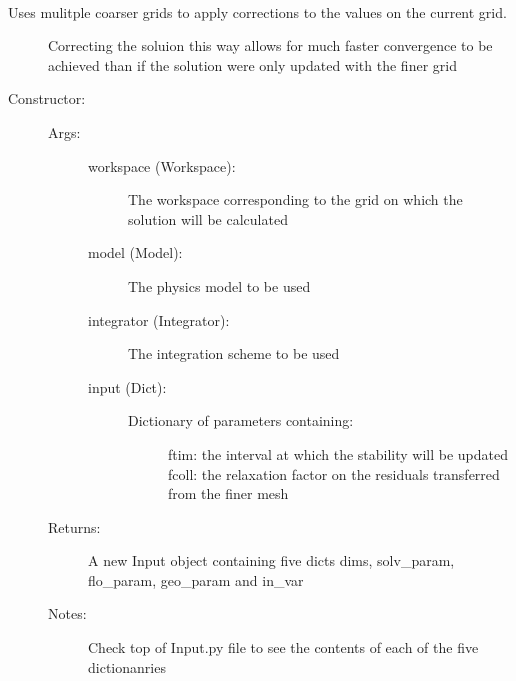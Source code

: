 \documentclass[letterpaper,10pt,english]{sphinxmanual}
\begin{document}
\begin{fulllineitems}
\label{\detokenize{autoapi/MultiGrid/index:MultiGrid.MultiGrid}}~\begin{description}
\item[{Uses mulitple coarser grids to apply corrections to the values on the current grid.}] \leavevmode
\sphinxAtStartPar
Correcting the soluion this way allows for much faster convergence to be achieved
than if the solution were only updated with the finer grid

\item[{Constructor:}] \leavevmode\begin{description}
\item[{Args:}] \leavevmode\begin{description}
\item[{workspace (Workspace):}] \leavevmode
\sphinxAtStartPar
The workspace corresponding to the grid on which the solution will be calculated

\item[{model (Model):}] \leavevmode
\sphinxAtStartPar
The physics model to be used

\item[{integrator (Integrator):}] \leavevmode
\sphinxAtStartPar
The integration scheme to be used

\item[{input (Dict):}] \leavevmode\begin{description}
\item[{Dictionary of parameters containing:}] \leavevmode
\sphinxAtStartPar
ftim: the interval at which the stability will be updated
fcoll: the relaxation factor on the residuals transferred from the finer mesh

\end{description}

\end{description}

\item[{Returns:}] \leavevmode
\sphinxAtStartPar
A new Input object containing five dicts \sphinxhyphen{} dims, solv\_param, flo\_param, geo\_param and in\_var

\item[{Notes:}] \leavevmode
\sphinxAtStartPar
Check top of Input.py file to see the contents of each of the five dictionanries


\end{description}
\end{description}
\end{fulllineitems}
\end{document}
